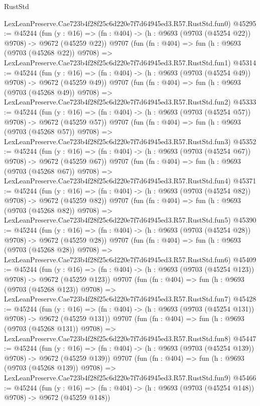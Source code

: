 \begin{lexlean}{RustStd}
\begin{coremodule}
    LexLeanPreserve.Cae723b4f28f25c6d220e7f7d64945ed3.R57.RustStd.fun0)
@45295 := @45244
    (fun (y : @16) => (fn : @404) -> (h : @9693 (@9703 (@45254 @22)) @9708) -> @9672 (@45259 @22))
    @9707
    (fun (fn : @404) =>
    fun (h : @9693 (@9703 (@45268 @22)) @9708) =>
    LexLeanPreserve.Cae723b4f28f25c6d220e7f7d64945ed3.R57.RustStd.fun1)
@45314 := @45244
    (fun (y : @16) => (fn : @404) -> (h : @9693 (@9703 (@45254 @49)) @9708) -> @9672 (@45259 @49))
    @9707
    (fun (fn : @404) =>
    fun (h : @9693 (@9703 (@45268 @49)) @9708) =>
    LexLeanPreserve.Cae723b4f28f25c6d220e7f7d64945ed3.R57.RustStd.fun2)
@45333 := @45244
    (fun (y : @16) => (fn : @404) -> (h : @9693 (@9703 (@45254 @57)) @9708) -> @9672 (@45259 @57))
    @9707
    (fun (fn : @404) =>
    fun (h : @9693 (@9703 (@45268 @57)) @9708) =>
    LexLeanPreserve.Cae723b4f28f25c6d220e7f7d64945ed3.R57.RustStd.fun3)
@45352 := @45244
    (fun (y : @16) => (fn : @404) -> (h : @9693 (@9703 (@45254 @67)) @9708) -> @9672 (@45259 @67))
    @9707
    (fun (fn : @404) =>
    fun (h : @9693 (@9703 (@45268 @67)) @9708) =>
    LexLeanPreserve.Cae723b4f28f25c6d220e7f7d64945ed3.R57.RustStd.fun4)
@45371 := @45244
    (fun (y : @16) => (fn : @404) -> (h : @9693 (@9703 (@45254 @82)) @9708) -> @9672 (@45259 @82))
    @9707
    (fun (fn : @404) =>
    fun (h : @9693 (@9703 (@45268 @82)) @9708) =>
    LexLeanPreserve.Cae723b4f28f25c6d220e7f7d64945ed3.R57.RustStd.fun5)
@45390 := @45244
    (fun (y : @16) => (fn : @404) -> (h : @9693 (@9703 (@45254 @28)) @9708) -> @9672 (@45259 @28))
    @9707
    (fun (fn : @404) =>
    fun (h : @9693 (@9703 (@45268 @28)) @9708) =>
    LexLeanPreserve.Cae723b4f28f25c6d220e7f7d64945ed3.R57.RustStd.fun6)
@45409 := @45244
    (fun (y : @16) => (fn : @404) -> (h : @9693 (@9703 (@45254 @123)) @9708) -> @9672 (@45259 @123))
    @9707
    (fun (fn : @404) =>
    fun (h : @9693 (@9703 (@45268 @123)) @9708) =>
    LexLeanPreserve.Cae723b4f28f25c6d220e7f7d64945ed3.R57.RustStd.fun7)
@45428 := @45244
    (fun (y : @16) => (fn : @404) -> (h : @9693 (@9703 (@45254 @131)) @9708) -> @9672 (@45259 @131))
    @9707
    (fun (fn : @404) =>
    fun (h : @9693 (@9703 (@45268 @131)) @9708) =>
    LexLeanPreserve.Cae723b4f28f25c6d220e7f7d64945ed3.R57.RustStd.fun8)
@45447 := @45244
    (fun (y : @16) => (fn : @404) -> (h : @9693 (@9703 (@45254 @139)) @9708) -> @9672 (@45259 @139))
    @9707
    (fun (fn : @404) =>
    fun (h : @9693 (@9703 (@45268 @139)) @9708) =>
    LexLeanPreserve.Cae723b4f28f25c6d220e7f7d64945ed3.R57.RustStd.fun9)
@45466 := @45244
    (fun (y : @16) => (fn : @404) -> (h : @9693 (@9703 (@45254 @148)) @9708) -> @9672 (@45259 @148))

\end{coremodule}
\end{lexlean}
